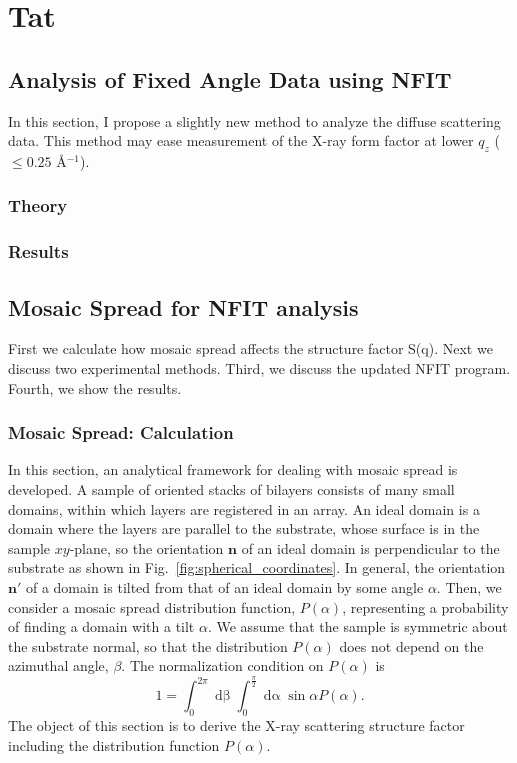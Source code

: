 \chapter{Tat}
\section{Analysis of Fixed Angle Data using NFIT}\label{sec:fixed_angle_analysis}
In this section, I propose a slightly new method to analyze the diffuse 
scattering data. This method may ease measurement of the X-ray form factor
at lower $q_z$ ($\leq 0.25$ \AA$^{-1}$). 

\subsection{Theory}

\subsection{Results}

\section{Mosaic Spread for NFIT analysis}
\label{sec:mosaic_spread}
First we calculate how mosaic spread affects the structure factor S(q). 
Next we discuss two experimental methods. Third, we discuss the updated NFIT program.
Fourth, we show the results.

\subsection{Mosaic Spread: Calculation}\label{app:mosaic_calc}
In this section, an analytical framework for dealing with mosaic spread is 
developed. A sample of oriented stacks of bilayers consists of many small domains, 
within which layers are registered in an array. 
An ideal domain is a domain where the layers are parallel to the substrate, whose
surface is in the sample $xy$-plane, so
the orientation $\mathbf{n}$ of an ideal domain is perpendicular
to the substrate as shown in Fig.~\ref{fig:spherical_coordinates}.
In general, the orientation $\mathbf{n'}$ of a domain is tilted from that of an
ideal domain by some angle $\alpha$. 
Then, we consider a mosaic spread distribution function, $P(\alpha)$, 
representing a probability of finding a domain with a tilt $\alpha$. 
We assume that the sample is symmetric about the substrate normal, 
so that the distribution $P(\alpha)$ does not depend on the azimuthal angle, $\beta$. 
The normalization condition on $P(\alpha)$ is 
\begin{equation}
  1 = \int_0^{2\pi}\mathop{d\beta}  
      \int_0^{\frac{\pi}{2}}\mathop{d\alpha}\sin\alpha P(\alpha).
\end{equation}
The object of this section is to derive the X-ray scattering structure factor 
including the distribution function $P(\alpha)$. 

